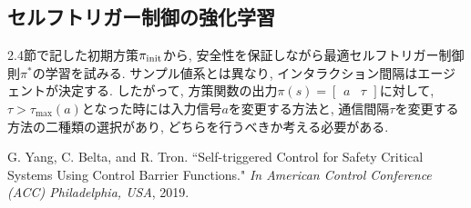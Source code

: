 \documentclass{jsarticle}
\begin{document}
\subsection{セルフトリガー制御の強化学習}
2.4節で記した初期方策$\pi_{\rm{init}}$から, 安全性を保証しながら最適セルフトリガー制御則$\pi^{*}$の学習を試みる. サンプル値系とは異なり, インタラクション間隔はエージェントが決定する. したがって, 方策関数の出力$\pi(s) = \begin{bmatrix}a & \tau\end{bmatrix}$に対して,~$\tau>\tau_{\textrm{max}}(a)$となった時には入力信号$a$を変更する方法と, 通信間隔$\tau$を変更する方法の二種類の選択があり, どちらを行うべきか考える必要がある.


\begin{thebibliography}{10}
G. Yang, C. Belta, and R. Tron. “Self-triggered Control for Safety Critical Systems Using Control Barrier Functions."  \textit{In American Control Conference (ACC) Philadelphia, USA}, 2019.
 
 \end{thebibliography}
\end{document}
